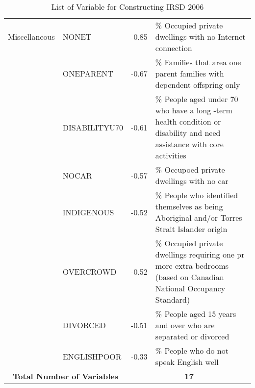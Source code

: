 \begin{table}[t]
{\begin{tabular}{c p{}c p{}}
Miscellaneous                          & NONET                      & -0.85            & \% Occupied private dwellings   with no Internet connection                                                               \\ \cline{2-4}
                                       & ONEPARENT                  & -0.67            & \% Families that area one parent   families with dependent offspring only                                                 \\ \cline{2-4}
                                       & DISABILITYU70              & -0.61            & \% People aged under 70 who have   a long -term health condition or disability and need assistance with core   activities \\ \cline{2-4}
                                       & NOCAR                      & -0.57            & \% Occupoed private dwellings   with no car                                                                               \\ \cline{2-4}
                                       & INDIGENOUS                 & -0.52            & \% People who identified   themselves as being Aboriginal and/or Torres Strait Islander origin                            \\ \cline{2-4}
                                       & OVERCROWD                  & -0.52            & \% Occupied private dwellings   requiring one pr more extra bedrooms (based on Canadian National Occupancy   Standard)    \\ \cline{2-4}
                                       & DIVORCED                   & -0.51            & \% People aged 15 years and over   who are separated or divorced                                                          \\ \cline{2-4}
                                       & ENGLISHPOOR                & -0.33            & \% People who do not speak   English well                                                                                 \\ \hline
\multicolumn{2}{c}{\textbf{Total Number   of Variables}}                     & \multicolumn{2}{c}{\textbf{17}}\\ \hline
\end{tabular}
}
\caption{List of Variable for Constructing IRSD 2006}
\label{tbl-IRSDloading06}
\end{table}

